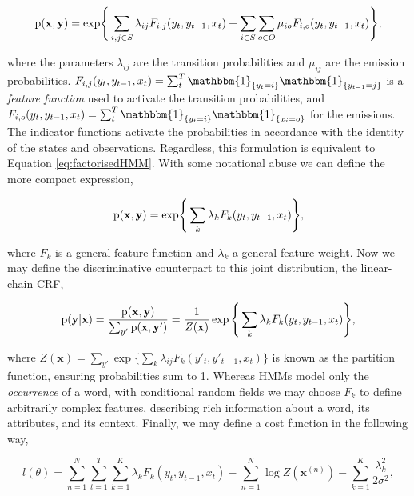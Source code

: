 \begin{equation}
\text{p}(\textbf{x}, \textbf{y}) = \text{exp} \Bigg\{
\sum_{i, j \in S}{
\lambda_{ij}F_{i,j}(y_t, y_{t-1}, x_t)
}
+
\sum_{i \in S}\sum_{o \in O}{
\mu_{io}F_{i,o}(y_t, y_{t-1}, x_t)
}
\Bigg\},
\label{eq:jointcrf}
\end{equation}

where the parameters $\lambda_{ij}$ are the transition probabilities and $\mu_{ij}$ are the emission probabilities. $F_{i,j}(y_t, y_{t-1}, x_t) = \sum_t^T\mathbbm{1}_{\{y_t = i\}}\mathbbm{1}_{\{y_{t-1} = j\}}$ is a \emph{feature function} used to activate the transition probabilities, and $F_{i,o}(y_t, y_{t-1}, x_t) = \sum_t^T\mathbbm{1}_{\{y_t = i\}}\mathbbm{1}_{\{x_{i} = o\}}$ for the emissions. The indicator functions activate the probabilities in accordance with the identity of the states and observations. Regardless, this formulation is equivalent to Equation \ref{eq:factorisedHMM}. With some notational abuse we can define the more compact expression,

\begin{equation}
\text{p}(\textbf{x}, \textbf{y}) = \text{exp} \Bigg\{\sum_k{
\lambda_{k}F_{k}(y_t, y_{t-1}, x_t)
}\Bigg\},
\label{eq:jointcrfcompact}
\end{equation}

where $F_k$ is a general feature function and $\lambda_k$ a general feature weight. Now we may define the discriminative counterpart to this joint distribution, the linear-chain CRF,

\begin{equation}
\text{p}(\textbf{y}|\textbf{x}) = \frac{\text{p}(\textbf{x}, \textbf{y})}{\sum_{y'}{\text{p}(\textbf{x}, \textbf{y}')}} = \frac{1}{Z(\mathbf{x})}\exp \Bigg\{\sum_k{
\lambda_{k}F_{k}(y_t, y_{t-1}, x_t)
}\Bigg\},
\end{equation}

where $Z(\mathbf{x}) = \sum_{y'}\exp \Big\{\sum_k{\lambda_{ij}F_{k}(y'_t, y'_{t-1}, x_t)}\Big\}$ is known as the partition function, ensuring probabilities sum to 1. Whereas HMMs model only the \emph{occurrence} of a word, with conditional random fields we may choose $F_k$ to define arbitrarily complex features, describing rich information about a word, its attributes, and its context. Finally, we may define a cost function in the following way,

\begin{equation}
l(\theta) = \sum_{n=1}^N\sum_{t=1}^T\sum_{k=1}^K\lambda_kF_{k}(y_t, y_{t-1}, x_t) - \sum_{n=1}^N\log Z(\mathbf{x}^{(n)}) - \sum_{k=1}^K \frac{\lambda_k^2}{2\sigma^2},
\end{equation}

